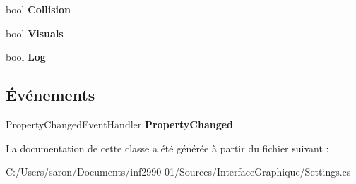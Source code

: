 \begin{DoxyCompactItemize}
\item 
\hypertarget{class_interface_graphique_1_1_settings_aa8221704d649ae5867445a7f104c5db1}{bool {\bfseries Collision}}\label{class_interface_graphique_1_1_settings_aa8221704d649ae5867445a7f104c5db1}

\item 
\hypertarget{class_interface_graphique_1_1_settings_af6ea47006fd058d37c9390c0c8c081df}{bool {\bfseries Visuals}}\label{class_interface_graphique_1_1_settings_af6ea47006fd058d37c9390c0c8c081df}

\item 
\hypertarget{class_interface_graphique_1_1_settings_aced28c76f88579bebc9e87592e8b81fd}{bool {\bfseries Log}}\label{class_interface_graphique_1_1_settings_aced28c76f88579bebc9e87592e8b81fd}

\end{DoxyCompactItemize}
\subsection*{Événements}
\begin{DoxyCompactItemize}
\item 
\hypertarget{class_interface_graphique_1_1_settings_a96981c3429546bacc8bb169cfb963705}{Property\-Changed\-Event\-Handler {\bfseries Property\-Changed}}\label{class_interface_graphique_1_1_settings_a96981c3429546bacc8bb169cfb963705}

\end{DoxyCompactItemize}


La documentation de cette classe a été générée à partir du fichier suivant \-:\begin{DoxyCompactItemize}
\item 
C\-:/\-Users/saron/\-Documents/inf2990-\/01/\-Sources/\-Interface\-Graphique/Settings.\-cs\end{DoxyCompactItemize}
